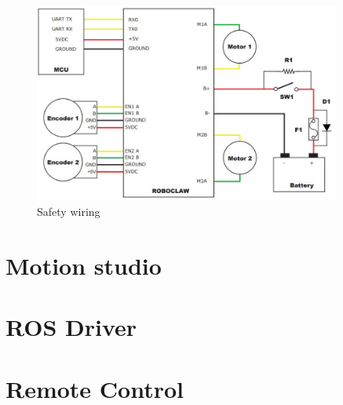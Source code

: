 \documentclass[12pt,letterpaper,oneside]{article}
\begin{document}
\newpage
\begin{figure}[h]
    \centering
    \includegraphics[width=0.9\textwidth]{figures/wiring.jpg}
    \caption{Safety wiring}
    \label{fig:my_label}
\end{figure}

\section{Motion studio}

\section{ROS Driver}

\section{Remote Control}

\newpage
\printbibliography
\end{document}
